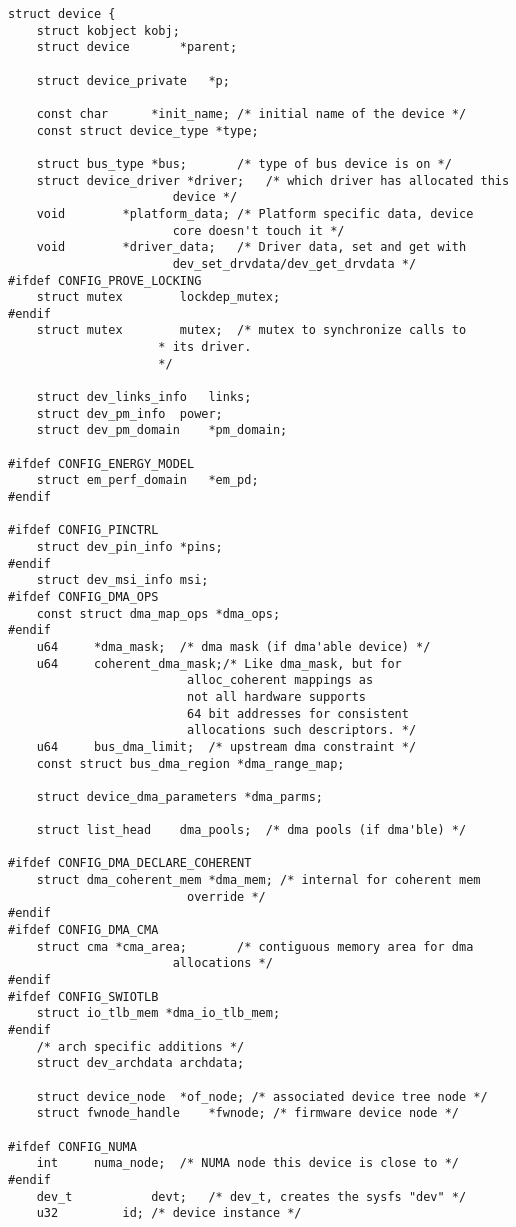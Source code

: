 
\begin{lstlisting}
struct device {
	struct kobject kobj;
	struct device		*parent;

	struct device_private	*p;

	const char		*init_name; /* initial name of the device */
	const struct device_type *type;

	struct bus_type	*bus;		/* type of bus device is on */
	struct device_driver *driver;	/* which driver has allocated this
					   device */
	void		*platform_data;	/* Platform specific data, device
					   core doesn't touch it */
	void		*driver_data;	/* Driver data, set and get with
					   dev_set_drvdata/dev_get_drvdata */
#ifdef CONFIG_PROVE_LOCKING
	struct mutex		lockdep_mutex;
#endif
	struct mutex		mutex;	/* mutex to synchronize calls to
					 * its driver.
					 */

	struct dev_links_info	links;
	struct dev_pm_info	power;
	struct dev_pm_domain	*pm_domain;

#ifdef CONFIG_ENERGY_MODEL
	struct em_perf_domain	*em_pd;
#endif

#ifdef CONFIG_PINCTRL
	struct dev_pin_info	*pins;
#endif
	struct dev_msi_info	msi;
#ifdef CONFIG_DMA_OPS
	const struct dma_map_ops *dma_ops;
#endif
	u64		*dma_mask;	/* dma mask (if dma'able device) */
	u64		coherent_dma_mask;/* Like dma_mask, but for
					     alloc_coherent mappings as
					     not all hardware supports
					     64 bit addresses for consistent
					     allocations such descriptors. */
	u64		bus_dma_limit;	/* upstream dma constraint */
	const struct bus_dma_region *dma_range_map;

	struct device_dma_parameters *dma_parms;

	struct list_head	dma_pools;	/* dma pools (if dma'ble) */

#ifdef CONFIG_DMA_DECLARE_COHERENT
	struct dma_coherent_mem	*dma_mem; /* internal for coherent mem
					     override */
#endif
#ifdef CONFIG_DMA_CMA
	struct cma *cma_area;		/* contiguous memory area for dma
					   allocations */
#endif
#ifdef CONFIG_SWIOTLB
	struct io_tlb_mem *dma_io_tlb_mem;
#endif
	/* arch specific additions */
	struct dev_archdata	archdata;

	struct device_node	*of_node; /* associated device tree node */
	struct fwnode_handle	*fwnode; /* firmware device node */

#ifdef CONFIG_NUMA
	int		numa_node;	/* NUMA node this device is close to */
#endif
	dev_t			devt;	/* dev_t, creates the sysfs "dev" */
	u32			id;	/* device instance */


\end{lstlisting}
